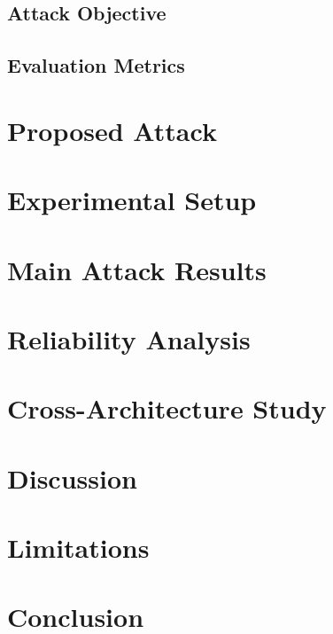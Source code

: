 \documentclass[UTF8,a4paper,11pt]{ctexart}
\begin{document}
\subsection{Attack Objective}


\subsection{Evaluation Metrics}

\section{Proposed Attack}

\section{Experimental Setup}

\section{Main Attack Results}

\section{Reliability Analysis}

\section{Cross-Architecture Study}

\section{Discussion}

\section{Limitations}

\section{Conclusion}
\end{document}
